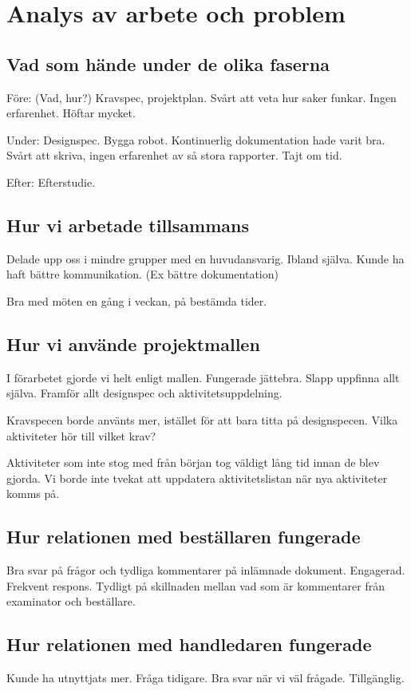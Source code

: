 \documentclass[a4paper,12pt]{article}
\begin{document}
\section{Analys av arbete och problem}

\subsection{Vad som hände under de olika faserna}
Före: (Vad, hur?) Kravspec, projektplan.  Svårt att veta hur saker funkar. Ingen erfarenhet. Höftar mycket. 

Under: Designspec. Bygga robot. Kontinuerlig dokumentation hade varit bra. Svårt att skriva, ingen erfarenhet av så stora rapporter. Tajt om tid. 

Efter: Efterstudie. 

\subsection{Hur vi arbetade tillsammans}
Delade upp oss i mindre grupper med en huvudansvarig. Ibland själva. Kunde ha haft bättre kommunikation. (Ex bättre dokumentation) 

Bra med möten en gång i veckan, på bestämda tider. 

\subsection{Hur vi använde projektmallen}
I förarbetet gjorde vi helt enligt mallen. Fungerade jättebra. Slapp uppfinna allt själva. Framför allt designspec och aktivitetsuppdelning. 

Kravspecen borde använts mer, istället för att bara titta på designspecen. Vilka aktiviteter hör till vilket krav? 

Aktiviteter som inte stog med från början tog väldigt lång tid innan de blev gjorda. Vi borde inte tvekat att uppdatera aktivitetslistan när nya aktiviteter komms på. 

\subsection{Hur relationen med beställaren fungerade}
Bra svar på frågor och tydliga kommentarer på inlämnade dokument. Engagerad. Frekvent respons. Tydligt på skillnaden mellan vad som 
är kommentarer från examinator och beställare. 

\subsection{Hur relationen med handledaren fungerade}
Kunde ha utnyttjats mer. Fråga tidigare. Bra svar när vi väl frågade. Tillgänglig. 
\end{document}
